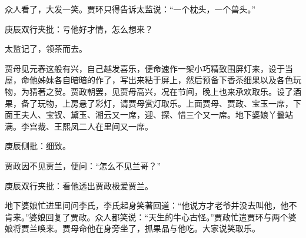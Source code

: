 \begin{parag}
    众人看了，大发一笑。贾环只得告诉太监说：“一个枕头，一个兽头。”\begin{note}庚辰双行夹批：亏他好才情，怎么想来？\end{note}太监记了，领茶而去。
\end{parag}


\begin{parag}
    贾母见元春这般有兴，自己越发喜乐，便命速作一架小巧精致围屏灯来，设于当屋，命他姊妹各自暗暗的作了，写出来粘于屏上，然后预备下香茶细果以及各色玩物，为猜著之贺。贾政朝罢，见贾母高兴，况在节间，晚上也来承欢取乐。设了酒果，备了玩物，上房悬了彩灯，请贾母赏灯取乐。上面贾母、贾政、宝玉一席，下面王夫人、宝钗、黛玉、湘云又一席，迎、探、惜三个又一席。地下婆娘丫鬟站满。李宫裁、王熙凤二人在里间又一席。\begin{note}庚辰侧批：细致。\end{note}贾政因不见贾兰，便问：“怎么不见兰哥？”\begin{note}庚辰双行夹批：看他透出贾政极爱贾兰。\end{note}地下婆娘忙进里间问李氏，李氏起身笑著回道：“他说方才老爷并没去叫他，他不肯来。”婆娘回复了贾政。众人都笑说：“天生的牛心古怪。”贾政忙遣贾环与两个婆娘将贾兰唤来。贾母命他在身旁坐了，抓果品与他吃。大家说笑取乐。
\end{parag}


